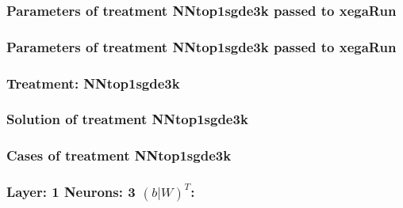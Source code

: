 \documentclass[18pt,c]{beamer}
\begin{document}

 \begin{frame}
 \fontsize{8pt}{9pt}\selectfont
 \frametitle{  Parameters of treatment NNtop1sgde3k passed to xegaRun
 }

 \label{ExpDtParmTable019.tex}  
 \end{frame}


 \begin{frame}
 \fontsize{8pt}{9pt}\selectfont
 \frametitle{  Parameters of treatment NNtop1sgde3k passed to xegaRun
 }

 \label{ExpDtParmTable020.tex}  
 \end{frame}

 \begin{frame}
 \fontsize{8pt}{9pt}\selectfont
 \frametitle{ Treatment: NNtop1sgde3k }

 \label{ExpDStatsTable009.tex}  
 \end{frame}

 \begin{frame}
 \fontsize{8pt}{9pt}\selectfont
 \frametitle{ Solution of treatment NNtop1sgde3k }

 \label{ExpDSolutionTable019.tex}  
 \end{frame}

 \begin{frame}
 \fontsize{8pt}{9pt}\selectfont
 \frametitle{ Cases of treatment NNtop1sgde3k }

 \label{ExpDSolutionTable020.tex}  
 \end{frame}


 \begin{frame}
 \fontsize{8pt}{9pt}\selectfont
 \frametitle{ Layer: 1 Neurons: 3  $(b|W)^T$: 
 }

 \label{ExpDNNWeightTable018.tex}  
 \end{frame}
\end{document}
